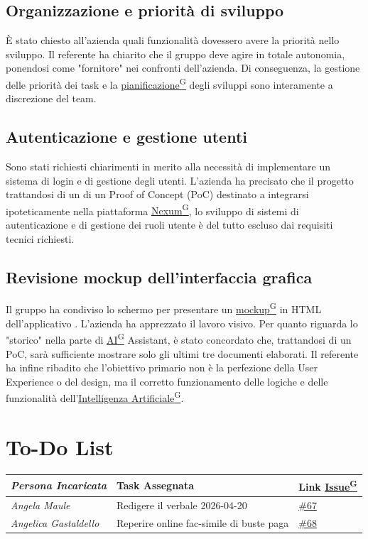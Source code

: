 \documentclass[a4paper,12pt]{article}
\providecommand{\glslink}[2]{\href{https://alittlebyte-19.github.io/Documentazione/glossario.html\#gls-#1}{\underline{#2}\textsuperscript{\scriptsize G}}}
\begin{document}
\subsection{Organizzazione e priorità di sviluppo}
È stato chiesto all'azienda quali funzionalità dovessero avere la priorità nello sviluppo. Il referente ha chiarito che il gruppo deve agire in totale autonomia, ponendosi come "fornitore" nei confronti dell'azienda. Di conseguenza, la gestione delle priorità dei task e la \glslink{pianificazione}{pianificazione} degli sviluppi sono interamente a discrezione del team.
\subsection{Autenticazione e gestione utenti}
Sono stati richiesti chiarimenti in merito alla necessità di implementare un sistema di login e di gestione degli utenti. L'azienda ha precisato che il progetto trattandosi di un di un Proof of Concept (PoC) destinato a integrarsi ipoteticamente nella piattaforma \glslink{nexum}{Nexum}, lo sviluppo di sistemi di autenticazione e di gestione dei ruoli utente è del tutto escluso dai requisiti tecnici richiesti.
\subsection{Revisione mockup dell'interfaccia grafica}
Il gruppo ha condiviso lo schermo per presentare un \glslink{mockup}{mockup} in HTML dell'applicativo . L'azienda ha apprezzato il lavoro visivo. Per quanto riguarda lo "storico" nella parte di \glslink{intelligenza-artificiale-ai}{AI} Assistant, è stato concordato che, trattandosi di un PoC, sarà sufficiente mostrare solo gli ultimi tre documenti elaborati. Il referente ha infine ribadito che l'obiettivo primario non è la perfezione della User Experience o del design, ma il corretto funzionamento delle logiche e delle funzionalità dell'\glslink{intelligenza-artificiale-ai}{Intelligenza Artificiale}.
\newpage
\section{To-Do List}
\begin{table}[h]
    \centering
    \begin{tabular}{|l|p{5cm}|l|}
    \hline
        \rowcolor{lightgray}\textit{\textbf{Persona Incaricata}}  & \textbf{Task Assegnata} &\textbf{Link \glslink{issue}{Issue}} \\
    \hline
        \textit{Angela Maule} & Redigere il verbale 2026-04-20 & \href{https://github.com/aLittleByte-19/Documentazione/issues/67}{\#67}\\
    \hline
        \textit{Angelica Gastaldello} & Reperire online fac-simile di buste paga &\href{https://github.com/aLittleByte-19/Documentazione/issues/68}{\#68}\\
    \hline
    \end{tabular}
    \label{tab:todo}
\end{table}
\end{document}
